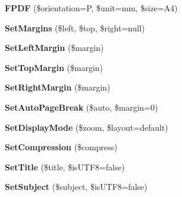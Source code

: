 \begin{DoxyCompactItemize}
\item 
\hypertarget{classFPDF_a38d6260bf42d1c581416bd5a23a3f850}{}{\bfseries F\+P\+D\+F} (\$orientation=\textquotesingle{}P\textquotesingle{}, \$unit=\textquotesingle{}mm\textquotesingle{}, \$size=\textquotesingle{}A4\textquotesingle{})\label{classFPDF_a38d6260bf42d1c581416bd5a23a3f850}

\item 
\hypertarget{classFPDF_a03ee8480b6a0b9362820d225c309f603}{}{\bfseries Set\+Margins} (\$left, \$top, \$right=null)\label{classFPDF_a03ee8480b6a0b9362820d225c309f603}

\item 
\hypertarget{classFPDF_a64306dab17b5156dbb09151818ebf98b}{}{\bfseries Set\+Left\+Margin} (\$margin)\label{classFPDF_a64306dab17b5156dbb09151818ebf98b}

\item 
\hypertarget{classFPDF_aeb7511c3d686e2aa9f9496f1b1ec147f}{}{\bfseries Set\+Top\+Margin} (\$margin)\label{classFPDF_aeb7511c3d686e2aa9f9496f1b1ec147f}

\item 
\hypertarget{classFPDF_a1008ef2dbf448c60dd2f9324bcc6601a}{}{\bfseries Set\+Right\+Margin} (\$margin)\label{classFPDF_a1008ef2dbf448c60dd2f9324bcc6601a}

\item 
\hypertarget{classFPDF_a55c2e62a11e10dd7bc0c8aa089ba1c5e}{}{\bfseries Set\+Auto\+Page\+Break} (\$auto, \$margin=0)\label{classFPDF_a55c2e62a11e10dd7bc0c8aa089ba1c5e}

\item 
\hypertarget{classFPDF_aa0695aab6e2889198e94a48b87ddaae6}{}{\bfseries Set\+Display\+Mode} (\$zoom, \$layout=\textquotesingle{}default\textquotesingle{})\label{classFPDF_aa0695aab6e2889198e94a48b87ddaae6}

\item 
\hypertarget{classFPDF_ab56cc065fff6c44c473c7f0428876486}{}{\bfseries Set\+Compression} (\$compress)\label{classFPDF_ab56cc065fff6c44c473c7f0428876486}

\item 
\hypertarget{classFPDF_a8a8a4c77944aae4ac0219fefbe53b494}{}{\bfseries Set\+Title} (\$title, \$is\+U\+T\+F8=false)\label{classFPDF_a8a8a4c77944aae4ac0219fefbe53b494}

\item 
\hypertarget{classFPDF_a29e614b472d76809a7f24d8382b2aec8}{}{\bfseries Set\+Subject} (\$subject, \$is\+U\+T\+F8=false)\label{classFPDF_a29e614b472d76809a7f24d8382b2aec8}


\end{DoxyCompactItemize}
